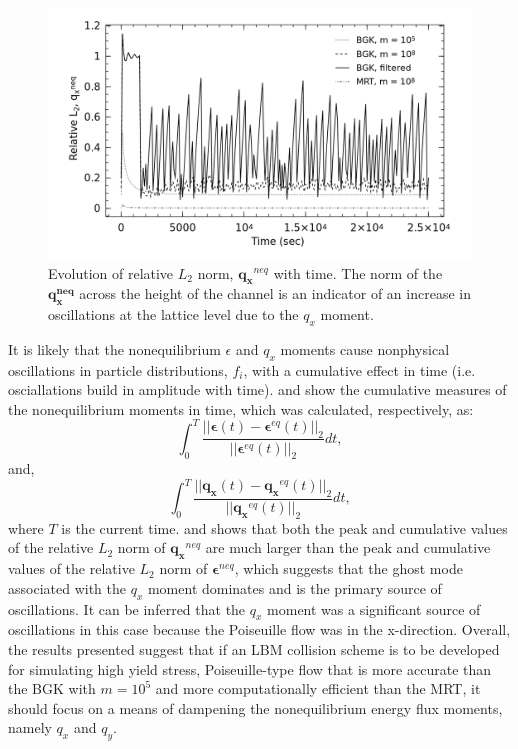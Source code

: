 \begin{figure}
	\centering
    \includegraphics[width=\linewidth]{figs/poise-bingham/qx}
    \caption{Evolution of relative $L_2$ norm, $\mathbf{q_x}^{neq}$ with time. The norm of the $\mathbf{q_x^{neq}}$ across the height of the channel is an indicator of an increase in oscillations at the lattice level due to the $q_x$ moment.}
    \label{fig:qx}
\end{figure}

It is likely that the nonequilibrium $\epsilon$ and $q_x$ moments cause nonphysical oscillations in particle distributions, $f_i$, with a cumulative effect in time (i.e. osciallations build in amplitude with time).
 and  show the cumulative measures of the nonequilibrium moments in time, which was calculated, respectively, as:
\begin{equation}
  \int_0^{T} \frac{||\boldsymbol{\epsilon}(t) - \boldsymbol{\epsilon}^{eq}(t)||_2}{||\boldsymbol{\epsilon}^{eq}(t)||_2} dt,
\end{equation}
\noindent and,
\begin{equation}
  \int_0^{T} \frac{||\mathbf{q_x}(t) - \mathbf{q_x}^{eq}(t)||_2}{||\mathbf{q_x}^{eq}(t)||_2} dt,
\end{equation}
\noindent where $T$ is the current time. 
 and  shows that both the peak and cumulative values of the relative $L_2$ norm of $\mathbf{q_x}^{neq}$ are much larger than the peak and cumulative values of the relative $L_2$ norm of $\boldsymbol{\epsilon}^{neq}$, which suggests that the ghost mode associated with the $q_x$ moment dominates and is the primary source of oscillations.
It can be inferred that the $q_x$ moment was a significant source of oscillations in this case because the Poiseuille flow was in the x-direction.
Overall, the results presented suggest that if an LBM collision scheme is to be developed for simulating high yield stress, Poiseuille-type flow that is more accurate than the BGK with $m = 10^5$ and more computationally efficient than the MRT, it should focus on a means of dampening the nonequilibrium energy flux moments, namely $q_x$ and $q_y$.

